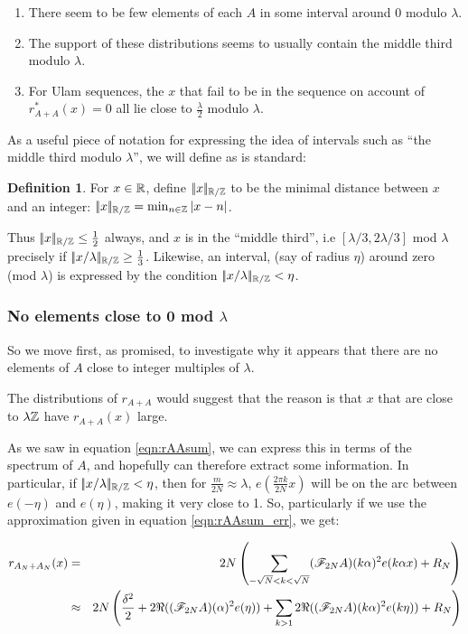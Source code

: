 \documentclass{article}
\theoremstyle{definition}
\newtheorem{definition}{Definition}
\theoremstyle{remark}
\numberwithin{equation}{section}
\begin{document}
\begin{enumerate}
\item There seem to be few elements of each $A$ in some interval
  around 0 modulo $\lambda$.
\item The support of these distributions seems to usually contain the
  middle third modulo $\lambda$.  
\item For Ulam sequences, the $x$ that fail to be in the sequence on
  account of $r^*_{A+A}(x) = 0$ all lie close to $\frac\lambda2$
  modulo $\lambda$.  
\end{enumerate}

As a useful piece of notation for expressing the idea of intervals
such as ``the middle third modulo $\lambda$'', we will define as is
standard:

\begin{definition}
For $x \in \mathbb{R}$, define $|\!|x|\!|_{\mathbb{R}/\mathbb{Z}}$ to be the minimal distance between
$x$ and an integer: $|\!|x|\!|_{\mathbb{R}/\mathbb{Z}} = \min_{n \in \mathbb{Z}} |x-n|$.
\end{definition}

Thus $|\!|x|\!|_{\mathbb{R}/\mathbb{Z}} \leq \frac12$ always, and $x$ is in the ``middle
third'', i.e $[\lambda/3, 2\lambda/3]$ mod $\lambda$ precisely if
$|\!|x/\lambda|\!|_{\mathbb{R}/\mathbb{Z}} \geq \frac13$.  Likewise, an interval, (say of
radius $\eta$) around zero (mod $\lambda$) is expressed by the
condition $|\!|x/\lambda|\!|_{\mathbb{R}/\mathbb{Z}} < \eta$.  

\subsubsection{No elements close to 0 mod $\lambda$}

So we move first, as promised, to investigate why it appears that
there are no elements of $A$ close to integer multiples of $\lambda$.

The distributions of $r_{A+A}$ would suggest that the reason is that
$x$ that are close to $\lambda\mathbb{Z}$ have $r_{A+A}(x)$ large.  

As we saw in equation \ref{eqn:rAAsum}, we can express this in terms
of the spectrum of $A$, and hopefully can therefore extract some
information.  In particular, if $|\!|x/\lambda|\!|_{\mathbb{R}/\mathbb{Z}} < \eta$, then for
$\frac{m}{2N} \approx \lambda$, $e(\frac{2\pi k}{2N} x)$ will be on
the arc between $e(-\eta)$ and $e(\eta)$, making it very close to 1.
So, particularly if we use the approximation given in equation
\ref{eqn:rAAsum_err}, we get: 

\begin{eqnarray*}
  r_{A_N + A_N}(x) &=& 2N \left(\sum_{-\sqrt{N} < k < \sqrt{N}}
                       (\mathscr{F}_{2N}A)(k\alpha)^2 e(k\alpha x) + R_N\right)\\
                   &\approx& 2N \left(\frac{\delta^2}{2} +
                             2\Re((\mathscr{F}_{2N}A)(\alpha)^2 e(\eta)) + \sum_{k > 1}
                             2\Re((\mathscr{F}_{2N}A)(k\alpha)^2 e(k\eta)) + R_N\right)\\
\end{eqnarray*}
\end{document}
